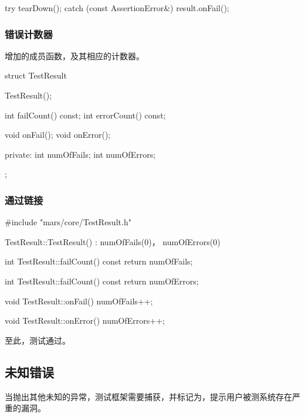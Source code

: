 \begin{content}
\begin{leftbar}
\begin{c++}[caption={\ttfamily{src/mars/core/TestCase.cc}}]
{  try {
    tearDown();
  } catch (const AssertionError&) {
    result.onFail();
  }
}
 \end{c++}
\end{leftbar}

\subsubsection{错误计数器}

增加的成员函数，及其相应的计数器。

\begin{leftbar}
 \begin{c++}[caption={\ttfamily{include/mars/core/TestResult.h}}]
struct TestResult {
  TestResult();

  int failCount() const;
  int errorCount() const;

  void onFail();
  void onError();

private:
  int numOfFails;
  int numOfErrors;
};
 \end{c++}
\end{leftbar}

\subsubsection{通过链接}

\begin{leftbar}
 \begin{c++}[caption={\ttfamily{src/mars/core/TestResult.cc}}]
#include "mars/core/TestResult.h"

TestResult::TestResult()
  : numOfFails(0)， numOfErrors(0) {
}

int TestResult::failCount() const {
  return numOfFails;
}

int TestResult::failCount() const {
  return numOfErrors;
}

void TestResult::onFail() {
  numOfFails++;
}

void TestResult::onError() {
  numOfErrors++;
}
 \end{c++}
\end{leftbar}

至此，测试通过。

\subsection{未知错误}

当抛出其他未知的异常，测试框架需要捕获，并标记为，提示用户被测系统存在严重的漏洞。


\end{content}
